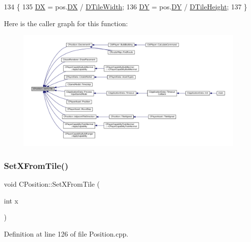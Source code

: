 \begin{DoxyCode}
134                                              \{
135     \hyperlink{classCPosition_a28445f9b872169715919074d82044eda}{DX} = pos.\hyperlink{classCPosition_a28445f9b872169715919074d82044eda}{DX} / \hyperlink{classCPosition_ac17d12fb5d35fcf62d63bb42e8cf7ed6}{DTileWidth};
136     \hyperlink{classCPosition_a84139c9e8eb547e7cf3cb851739943a4}{DY} = pos.\hyperlink{classCPosition_a84139c9e8eb547e7cf3cb851739943a4}{DY} / \hyperlink{classCPosition_a202ebb83e86df75cfb76cf1241ba817c}{DTileHeight};
137 \}
\end{DoxyCode}
Here is the caller graph for this function\+:
\nopagebreak
\begin{figure}[H]
\begin{center}
\leavevmode
\includegraphics[width=350pt]{classCPosition_ae302aa21792de64c97de29e2cbbfeb94_icgraph}
\end{center}
\end{figure}
\hypertarget{classCPosition_ac6a1eeaeb98e20942efea7cf253b2ec4}{}\label{classCPosition_ac6a1eeaeb98e20942efea7cf253b2ec4} 
\subsubsection{\texorpdfstring{Set\+X\+From\+Tile()}{SetXFromTile()}}
{\footnotesize\ttfamily void C\+Position\+::\+Set\+X\+From\+Tile (\begin{DoxyParamCaption}\item[{int}]{x }\end{DoxyParamCaption})}



Definition at line 126 of file Position.\+cpp.


